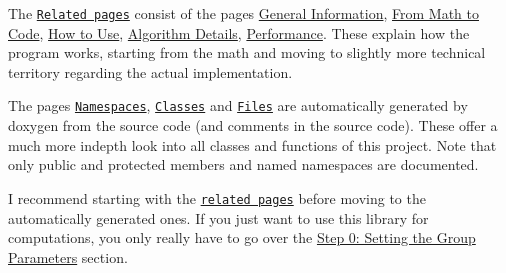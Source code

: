 \begin{DoxyItemize}
\item The \href{namespaces.html}{\tt Related pages} consist of the pages \hyperlink{index}{General Information}, \hyperlink{math}{From Math to Code}, \hyperlink{use}{How to Use}, \hyperlink{algo}{Algorithm Details}, \hyperlink{perf}{Performance}. These explain how the program works, starting from the math and moving to slightly more technical territory regarding the actual implementation.
\item The pages \href{namespaces.html}{\tt Namespaces}, \href{annotated.html}{\tt Classes} and \href{files.html}{\tt Files} are automatically generated by doxygen from the source code (and comments in the source code). These offer a much more indepth look into all classes and functions of this project. Note that only public and protected members and named namespaces are documented.
\item I recommend starting with the \href{namespaces.html}{\tt related pages} before moving to the automatically generated ones. If you just want to use this library for computations, you only really have to go over the \hyperlink{use_how}{Step 0\+: Setting the Group Parameters} section. 
\end{DoxyItemize}